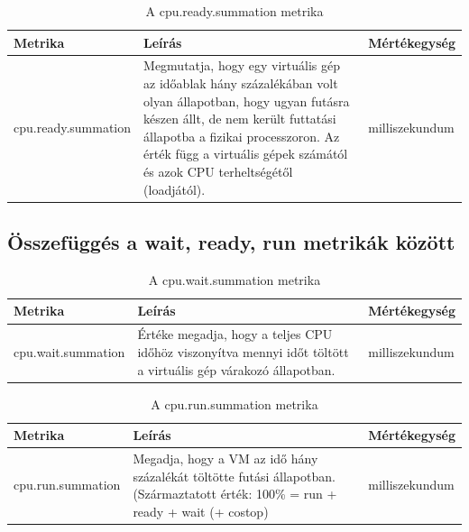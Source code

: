 \documentclass[a4paper,10pt,titlepage]{article}
\begin{document}
\begin{table}[h]
	\caption{A cpu.ready.summation metrika}
	\centering
	\small
	\begin{tabular}{| p{3.5cm} | p{7.5cm} | p{2cm} |}
		\hline
		\rowcolor{tc_bone} \textbf{Metrika} & \textbf{Leírás} & \textbf{Mértékegység} \\
		\hline
		cpu.ready.summation & Megmutatja, hogy egy virtuális gép az időablak hány százalékában volt olyan állapotban, hogy ugyan futásra készen állt, de nem került futtatási állapotba a fizikai processzoron. Az érték függ a virtuális gépek számától és azok CPU terheltségétől (loadjától). & milliszekundum \\ 
		\hline
	\end{tabular}
	\normalsize
	\label{tab:cpu.ready.summation}
\end{table}

\subsection{Összefüggés a wait, ready, run metrikák között}

\begin{table}[h]
	\caption{A cpu.wait.summation metrika}
	\centering
	\small
	\begin{tabular}{| p{3.5cm} | p{7.5cm} | p{2cm} |}
		\hline
		\rowcolor{tc_bone} \textbf{Metrika} & \textbf{Leírás} & \textbf{Mértékegység} \\
		\hline
		cpu.wait.summation & Értéke megadja, hogy a teljes CPU időhöz viszonyítva mennyi időt töltött a virtuális gép várakozó állapotban. & milliszekundum \\ 
		\hline
	\end{tabular}
	\normalsize
	\label{tab:cpu.wait.summation}
\end{table}

\begin{table}[h]
	\caption{A cpu.run.summation metrika}
	\centering
	\small
	\begin{tabular}{| p{3.5cm} | p{7.5cm} | p{2cm} |}
		\hline
		\rowcolor{tc_bone} \textbf{Metrika} & \textbf{Leírás} & \textbf{Mértékegység} \\
		\hline
		cpu.run.summation & Megadja, hogy a VM az idő hány százalékát töltötte futási állapotban. (Származtatott érték: 100\% = run + ready + wait (+ costop) & milliszekundum \\ 
		\hline
	\end{tabular}
	\normalsize
	\label{tab:cpu.run.summation}
\end{table}
\end{document}
